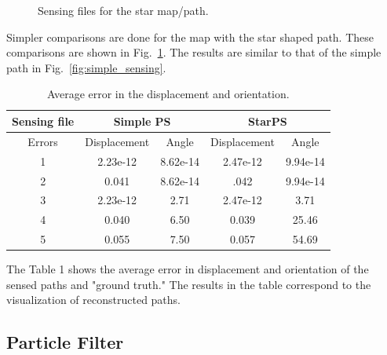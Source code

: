 \documentclass[a4paper,11pt]{report}
\begin{document}
\begin{figure}[t!]
	\caption{Sensing files for the star map/path.}
	\label{fig:star_sensing}
	\end{figure}
	
	Simpler comparisons are done for the map with the star shaped path. These comparisons are shown in Fig.~\ref{fig:star_sensing}. The results are similar to that of the simple path in Fig.~\ref{fig:simple_sensing}.
	
		\begin {table}[h]\small
		\centering
		\begin{tabular*}{0.66\textwidth}[left]{|c|c|c|c|c|}
		\hline
		  Sensing file & \multicolumn{2}{|c|}{Simple PS} & \multicolumn{2}{|c|}{StarPS}\\
		  \hline
		  Errors & Displacement & Angle & Displacement & Angle\\
		  \hline
		  1 & 2.23e-12 & 8.62e-14  & 2.47e-12 & 9.94e-14 \\
		  2 & 0.041 & 8.62e-14 & .042 & 9.94e-14\\
		  3 & 2.23e-12 & 2.71 & 2.47e-12 & 3.71  \\
		  4 & 0.040 & 6.50 & 0.039 & 25.46\\
		  5 & 0.055 & 7.50 & 0.057 & 54.69 \\
		  \hline
		
		\end{tabular*}
		    \caption{{\small Average error in the displacement and orientation.}}
		\end{table}
		
		The Table 1 shows the average error in displacement and orientation of the sensed paths and "ground truth." The results in the table correspond to the visualization of reconstructed paths. 
		
	\subsection{Particle Filter}
		
\end{document}
